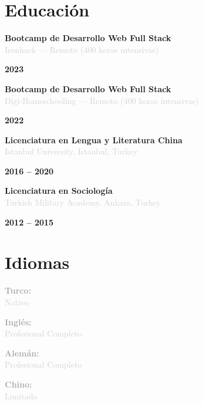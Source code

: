\documentclass[10pt,a4paper]{article}
\newcommand{\Education}[3]{%
  \vspace{2pt}
  \noindent
  \begin{minipage}[t]{0.70\textwidth}
    {\normalsize\textbf{\color{darkgray}#1}} \\
    \textcolor{lightgray}{\small #2}
  \end{minipage}%
  \hfill
  \begin{minipage}[t]{0.28\textwidth}
    \raggedleft
    \textcolor{mediumgray}{\small\textbf{#3}}
  \end{minipage}
  \vspace{1pt}
}
\begin{document}
\section*{Educación}

\Education{Bootcamp de Desarrollo Web Full Stack}{Ironhack — Remoto (400 horas intensivas)}{2023}

\Education{Bootcamp de Desarrollo Web Full Stack}{Digi-Homeschooling — Remoto (400 horas intensivas)}{2022}

\Education{Licenciatura en Lengua y Literatura China}{Istanbul University, Istanbul, Turkey}{2016 -- 2020}

\Education{Licenciatura en Sociología}{Turkish Military Academy, Ankara, Turkey}{2012 -- 2015}

\section*{Idiomas}

\vspace{1pt}
\noindent
\begin{minipage}[t]{0.24\textwidth}
  \textcolor{darkgray}{\textbf{Turco:}} \\
  \textcolor{lightgray}{\small Nativo}
\end{minipage}%
\hfill
\begin{minipage}[t]{0.24\textwidth}
  \textcolor{darkgray}{\textbf{Inglés:}} \\
  \textcolor{lightgray}{\small Profesional Completo}
\end{minipage}%
\hfill
\begin{minipage}[t]{0.24\textwidth}
  \textcolor{darkgray}{\textbf{Alemán:}} \\
  \textcolor{lightgray}{\small Profesional Completo}
\end{minipage}%
\hfill
\begin{minipage}[t]{0.24\textwidth}
  \textcolor{darkgray}{\textbf{Chino:}} \\
  \textcolor{lightgray}{\small Limitado}
\end{minipage}
\end{document}

